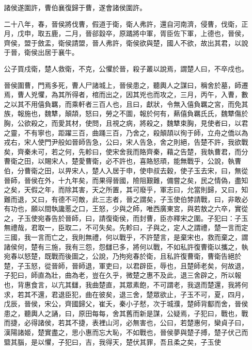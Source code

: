 \begin{pinyinscope}
諸侯遂圍許，曹伯襄復歸于曹，遂會諸侯圍許。

二十八年，春，晉侯將伐曹，假道于衛，衛人弗許，還自河南濟，侵曹，伐衛，正月，戊申，取五鹿，二月，晉郤縠卒，原蹫將中軍，胥臣佐下軍，上德也，晉侯，齊侯，盟于斂盂，衛侯請盟，晉人弗許，衛侯欲與楚，國人不欲，故出其君，以說于晉，衛侯出居于襄牛。

公子買戍衛，楚人救衛，不克，公懼於晉，殺子叢以說焉，謂楚人曰，不卒戍也。

晉侯圍曹，門焉多死，曹人尸諸城上，晉侯患之，聽輿人之謀曰，稱舍於墓，師遷焉，曹人兇懼，為其所得者，棺而出之，因其兇也而攻之，三月，丙午，入曹，數之以其不用僖負羈，而乘軒者三百人也，且曰，獻狀，令無入僖負羈之宮，而免其族，報施也，魏犨，顛頡，怒曰，勞之不圖，報於何有，爇僖負羈氏氏，魏犨傷於胸，公欲殺之，而愛其材，使問，且視之病，將殺之，魏犨束胸，見使者曰，以君之靈，不有寧也，距躍三百，曲踊三百，乃舍之，殺顛頡以徇于師，立舟之僑以為戎右，宋人使門尹般如晉師告急，公曰，宋人告急，舍之則絕，告楚不許，我欲戰矣，齊秦未可，若之何，先軫曰，使宋舍我而賂齊秦，藉之告楚，我執曹君，而分曹衛之田，以賜宋人，楚愛曹衛，必不許也，喜賂怒頑，能無戰乎，公說，執曹伯，分曹衛之田，以畀宋人，楚人入居于申，使申叔去穀，使子玉去宋，曰，無從晉師，晉侯在外，十九年矣，而果得晉國，險阻艱難，備嘗之矣，民之情偽，盡知之矣，天假之年，而除其害，天之所置，其可廢乎，軍志曰，允當則歸，又曰，知難而退，又曰，有德不可敵，此三志者，晉之謂矣，子玉使伯棼請戰，曰，非敢必有功也，願以間執讒慝之口，王怒，少與之師，唯西廣東宮，與若敖之六卒，實從之，子玉使宛春告於晉師，曰，請復衛侯，而封曹，臣亦釋宋之圍。子犯曰：子玉無禮哉，君取一，臣取二，不可失矣。先軫曰，子與之，定人之謂禮，楚一言而定三國，我一言而亡之，我則無禮，何以戰乎，不許楚言，是棄宋也，救而棄之，謂諸侯何，楚有三施，我有三怨，怨讎已多，將何以戰，不如私許復曹衛以攜之，執宛春以怒楚，既戰而後圖之，公說，乃拘宛春於衛，且私許復曹衛，曹衛告絕於楚，子玉怒，從晉師，晉師退，軍吏曰，以君辟臣，辱也，且楚師老矣，何故退，子犯曰，師直為壯，曲為老，豈在久乎，微楚之惠不及此，退三舍辟之，所以報也，背惠食言，以亢其讎，我曲楚直，其眾素飽，不可謂老，我退而楚還，我將何求，若其不還，君退臣犯，曲在彼矣，退三舍，楚眾欲止，子玉不可，夏，四月，戊辰，晉侯，宋公，齊國歸父，崔夭，秦小子憖，次于城濮，楚師背酅而舍，晉侯患之，聽輿人之誦，曰，原田每每，舍其舊而新是謀，公疑焉，子犯曰，戰也，戰而捷，必得諸侯，若其不捷，表裡山河，必無害也，公曰，若楚惠何，欒貞子曰，漢陽諸姬，楚實盡之，思小惠而忘大恥，不如戰也，晉侯夢與楚子搏，楚子伏己而盬其腦，是以懼，子犯曰，吉，我得天，楚伏其罪，吾且柔之矣，子玉使
\end{pinyinscope}
